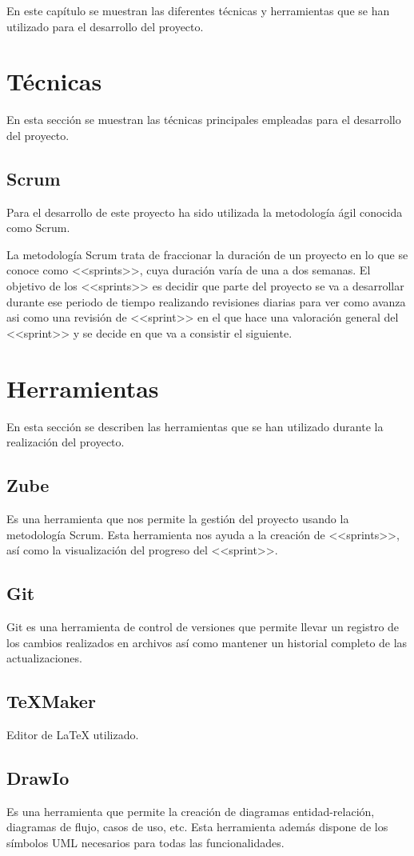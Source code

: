 
En este capítulo se muestran las diferentes técnicas y herramientas que se han utilizado para el desarrollo del proyecto.


\section{Técnicas}

En esta sección se muestran las técnicas principales empleadas para el desarrollo del proyecto.

\subsection{Scrum}

Para el desarrollo de este proyecto ha sido utilizada la metodología ágil conocida como Scrum.

La metodología Scrum trata de fraccionar la duración de un proyecto en lo que se conoce como <<sprints>>, cuya duración varía de una a dos semanas.
El objetivo de los <<sprints>> es decidir que parte del proyecto se va a desarrollar durante ese periodo de tiempo realizando revisiones diarias para ver como avanza asi como una revisión de <<sprint>> en el que hace una valoración general del <<sprint>> y se decide en que va a consistir el siguiente.

\section{Herramientas}

En esta sección se describen las herramientas que se han utilizado durante la realización del proyecto.

\subsection{Zube}

Es una herramienta que nos permite la gestión del proyecto usando la metodología Scrum. Esta herramienta nos ayuda a la creación de <<sprints>>, así como la visualización del progreso del <<sprint>>.


\subsection{Git}
Git es una herramienta de control de versiones que permite llevar un registro de los cambios realizados en archivos así como mantener un historial completo de las actualizaciones.


\subsection{\TeX{}Maker}
Editor de \LaTeX{} utilizado.

\subsection{DrawIo}
Es una herramienta que permite la creación de diagramas entidad-relación, diagramas de flujo, casos de uso, etc. Esta herramienta además dispone de los símbolos UML necesarios para todas las funcionalidades.